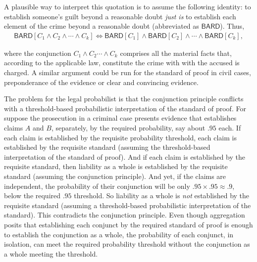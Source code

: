 \documentclass[
  10pt,
  dvipsnames,enabledeprecatedfontcommands]{scrartcl}
\newcommand{\et}{\wedge}
\begin{document}
\noindent A plausible way to interpret this quotation is to assume the
following identity: to establish someone's guilt beyond a reasonable
doubt \textit{just is} to establish each element of the crime beyond a
reasonable doubt (abbreviated as \(\mathsf{BARD}\)). Thus,
\begin{align*}\mathsf{BARD}[C_1 \wedge C_2   \wedge \cdots \wedge C_k] \Leftrightarrow \mathsf{BARD}[C_1] \wedge \mathsf{BARD}[C_2]  \wedge \cdots \wedge \mathsf{BARD}[C_k],
\end{align*}

\noindent where the conjunction \(C_1 \et C_2 \cdots \et C_k\) comprises
all the material facts that, according to the applicable law, constitute
the crime with with the accused is charged. A similar argument could be
run for the standard of proof in civil cases, preponderance of the
evidence or clear and convincing evidence.

The problem for the legal probabilist is that the conjunction principle
conflicts with a threshold-based probabilistic interpretation of the
standard of proof. For suppose the prosecution in a criminal case
presents evidence that establishes claims \(A\) and \(B\), separately,
by the required probability, say about \(.95\) each. If each claim is
established by the requisite probability threshold, each claim is
established by the requisite standard (assuming the threshold-based
interpretation of the standard of proof). And if each claim is
established by the requisite standard, then liability as a whole is
established by the requisite standard (assuming the conjunction
principle). And yet, if the claims are independent, the probability of
their conjunction will be only \(.95\times .95 \approx .9\), below the
required \(.95\) threshold. So liability as a whole is \textit{not}
established by the requisite standard (assuming a threshold-based
probabilistic interpretation of the standard). This contradicts the
conjunction principle. Even though aggregation posits that establishing
each conjunct by the required standard of proof is enough to establish
the conjunction as a whole, the probability of each conjunct, in
isolation, can meet the required probability threshold without the
conjunction as a whole meeting the threshold.
\end{document}

